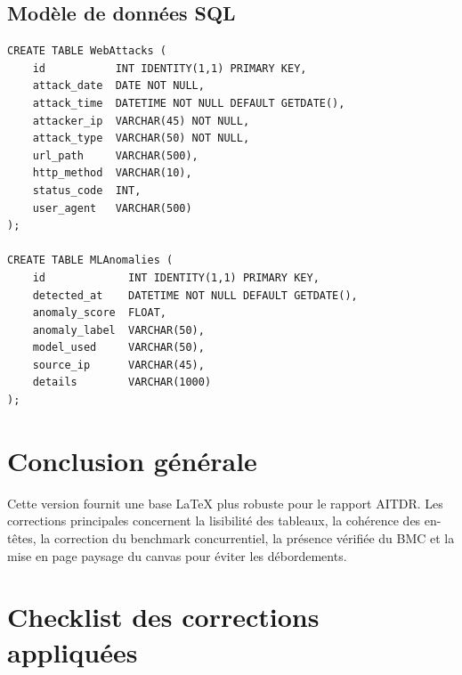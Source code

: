 \documentclass[11pt,a4paper]{report}
\begin{document}
\section{Modèle de données SQL}

\begin{lstlisting}[style=sqlstyle, caption={DDL principal}]
CREATE TABLE WebAttacks (
    id           INT IDENTITY(1,1) PRIMARY KEY,
    attack_date  DATE NOT NULL,
    attack_time  DATETIME NOT NULL DEFAULT GETDATE(),
    attacker_ip  VARCHAR(45) NOT NULL,
    attack_type  VARCHAR(50) NOT NULL,
    url_path     VARCHAR(500),
    http_method  VARCHAR(10),
    status_code  INT,
    user_agent   VARCHAR(500)
);

CREATE TABLE MLAnomalies (
    id             INT IDENTITY(1,1) PRIMARY KEY,
    detected_at    DATETIME NOT NULL DEFAULT GETDATE(),
    anomaly_score  FLOAT,
    anomaly_label  VARCHAR(50),
    model_used     VARCHAR(50),
    source_ip      VARCHAR(45),
    details        VARCHAR(1000)
);
\end{lstlisting}

\chapter*{Conclusion générale}

Cette version fournit une base LaTeX plus robuste pour le rapport AITDR. Les corrections principales concernent la lisibilité des tableaux, la cohérence des en-têtes, la correction du benchmark concurrentiel, la présence vérifiée du BMC et la mise en page paysage du canvas pour éviter les débordements.

\appendix

\chapter{Checklist des corrections appliquées}
\end{document}
